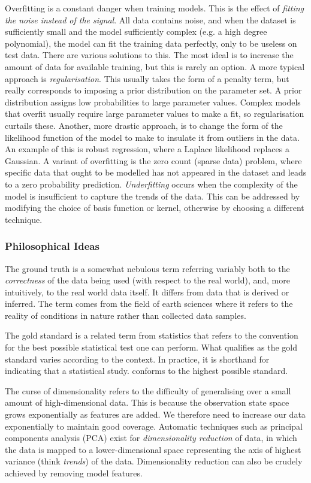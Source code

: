 \documentclass[11pt]{amsart}
\begin{document}
Overfitting is a constant danger when training models. This is the effect of \emph{fitting the noise instead of the signal}. All data contains noise, and when the dataset is sufficiently small and the model sufficiently complex (e.g. a high degree polynomial), the model can fit the training data perfectly, only to be useless on test data. There are various solutions to this. The most ideal is to increase the amount of data for available training, but this is rarely an option. A more typical approach is \emph{regularisation}. This usually takes the form of a penalty term, but really corresponds to imposing a prior distribution on the parameter set. A prior distribution assigns low probabilities to large parameter values. Complex models that overfit usually require large parameter values to make a fit, so regularisation curtails these. Another, more drastic approach, is to change the form of the likelihood function of the model to make to insulate it from outliers in the data. An example of this is robust regression, where a Laplace likelihood replaces a Gaussian. A variant of overfitting is the zero count (sparse data) problem, where specific data that ought to be modelled has not appeared in the dataset and leads to a zero probability prediction. \emph{Underfitting} occurs when the complexity of the model is insufficient to capture the trends of the data. This can be addressed by modifying the choice of basis function or kernel, otherwise by choosing a different technique.

\subsubsection{Philosophical Ideas}

The ground truth is a somewhat nebulous term referring variably both to the \emph{correctness} of the data being used (with respect to the real world), and, more intuitively, to the real world data itself. It differs from data that is derived or inferred. The term comes from the field of earth sciences where it refers to the reality of conditions in nature rather than collected data samples.

The gold standard is a related term from statistics that refers to the convention for the best possible statistical test one can perform. What qualifies as the gold standard varies according to the context. In practice, it is shorthand for indicating that a statistical study. conforms to the highest possible standard.

The curse of dimensionality refers to the difficulty of generalising over a small amount of high-dimensional data. This is because the observation state space grows exponentially as features are added. We therefore need to increase our data exponentially to maintain good coverage. Automatic techniques such as principal components analysis (PCA) exist for \emph{dimensionality reduction} of data, in which the data is mapped to a lower-dimensional space representing the axis of highest variance (think \emph{trends}) of the data. Dimensionality reduction can also be crudely achieved by removing model features.
\end{document}

